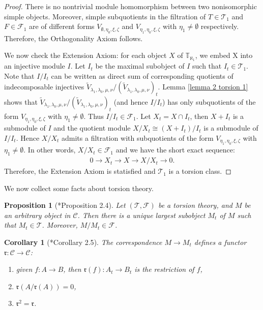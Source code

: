\documentclass[openany, a4paper]{amsbook}
\newtheorem{prop}[thm]{Proposition}
\newtheorem{cor}[thm]{Corollary}
\theoremstyle{definition}
\numberwithin{equation}{chapter}
\newcommand{\T}[1]{{\mathbb{T}}_{\aleph_{#1}}}
\begin{document}
\begin{proof}     
    There is no nontrivial module homomorphism between two nonisomorphic simple objects. Moreover, simple subquotients in the filtration of $T \in \mathcal{T}_1$ and $F \in \mathcal{F}_1$ are of different forms $V_{\emptyset, \eta_0, \xi, \zeta}$ and $V_{\eta_1, \eta_0, \xi, \zeta}$ with $\eta_1 \neq \emptyset$ respectively. Therefore, the Orthogonality Axiom follows.
    
    We now check the Extension Axiom: for each object $X$ of $\T{1}$, we embed X into an injective module $I$. Let $I_t$ be the maximal subobject of $I$ such that $I_t \in \mathcal{T}_1$.
    Note that $I/I_t$ can be written as direct sum of corresponding quotients of indecomposable injectives $\tilde{V}_{\lambda_1, \lambda_0, \mu, \nu}/(\tilde{V}_{\lambda_1, \lambda_0, \mu, \nu})_t$. Lemma \ref{lemma 2 torsion 1} shows that $\tilde{V}_{\lambda_1, \lambda_0, \mu, \nu}/(\tilde{V}_{\lambda_1, \lambda_0, \mu, \nu})_t$ (and hence $I/I_t$) has only subquotients of the form $V_{\eta_1, \eta_0, \xi, \zeta}$ with $\eta_1 \neq \emptyset$. Thus $I/I_t \in \mathcal{F}_1$. Let $X_t = X \cap I_t$, then $X+I_t$ is a submodule of $I$ and the quotient module $X/X_t \cong (X+I_t)/I_t$ is a submodule of $I/I_t$. Hence $X/X_t$ admits a filtration with subquotients of the form $V_{\eta_1, \eta_0, \xi, \zeta}$ with $\eta_1 \neq \emptyset$. In other words, $X/X_t \in \mathcal{F}_1$ and we have the short exact sequence: 
    \begin{align*}
        0 \to X_t \to X \to X/X_t \to 0.
    \end{align*}
    Therefore, the Extension Axiom is statisfied and $\mathcal{T}_1$ is a torsion class.
\end{proof}

We now collect some facts about torsion theory.
\begin{prop}[\cite{dickson}*{Proposition 2.4}]\label{dickson 2}
    Let $(\mathcal{T}, \mathcal{F})$ be a torsion theory, and $M$ be an arbitrary object in $\mathcal{C}$. Then there is a unique largest subobject $M_t$ of $M$ such that $M_t \in \mathcal{T}$. Moreover, $M/M_t \in \mathcal{F}$.
\end{prop}

\begin{cor}[\cite{dickson}*{Corollary 2.5}]\label{dickson 3}
    The correspondence $M \to M_t$ defines a functor $\mathfrak{r}: \mathcal{C} \to \mathcal{C}$:
    \begin{enumerate}
        \item given $f: A \to B$, then $\mathfrak{r}(f): A_t \to B_t$ is the restriction of $f$,
        \item $\mathfrak{r}(A/\mathfrak{r}(A)) = 0$,
        \item $\mathfrak{r}^2 = \mathfrak{r}$. 
    \end{enumerate}
\end{cor}
\end{document}
